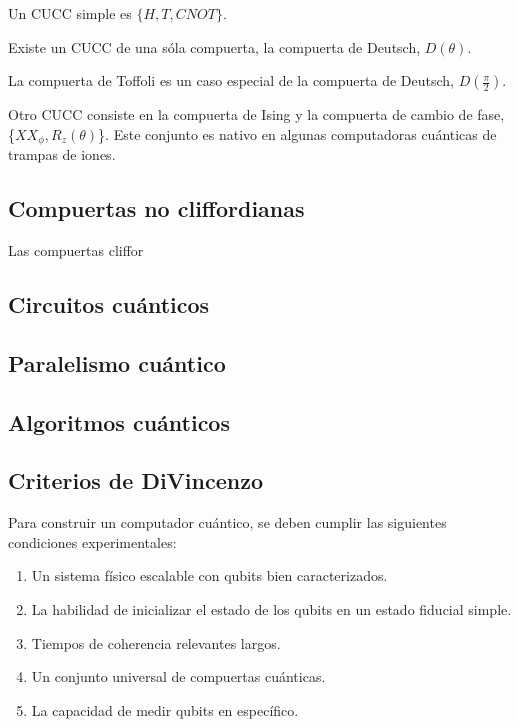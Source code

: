 \documentclass[11pt, spanish]{report}
\begin{document}
Un CUCC simple es $\{H,T,\mathit{CNOT}\}$.
\vspace{0.5cm}

Existe un CUCC de una sóla compuerta, la compuerta de Deutsch, $D(\theta)$.
\vspace{0.5cm}

La compuerta de Toffoli es un caso especial de la compuerta de Deutsch, $D(\frac{\pi}{2})$.
\vspace{0.5cm}

Otro CUCC consiste en la compuerta de Ising y la compuerta de cambio de fase, \{$\mathit{XX}_\phi,R_z(\theta)$\}. Este conjunto es nativo en algunas computadoras cuánticas de trampas de iones.

\subsection{Compuertas no cliffordianas}
Las compuertas cliffor


\subsection{Circuitos cuánticos}

\subsection{Paralelismo cuántico}

\subsection{Algoritmos cuánticos}

\subsection{Criterios de DiVincenzo}
Para construir un computador cuántico, se deben cumplir las siguientes condiciones experimentales:

\begin{enumerate}
\item Un sistema físico escalable con qubits bien caracterizados.
\item La habilidad de inicializar el estado de los qubits en un estado fiducial simple.
\item Tiempos de coherencia relevantes largos.
\item Un conjunto universal de compuertas cuánticas.
\item La capacidad de medir qubits en específico.
\end{enumerate}
\end{document}
